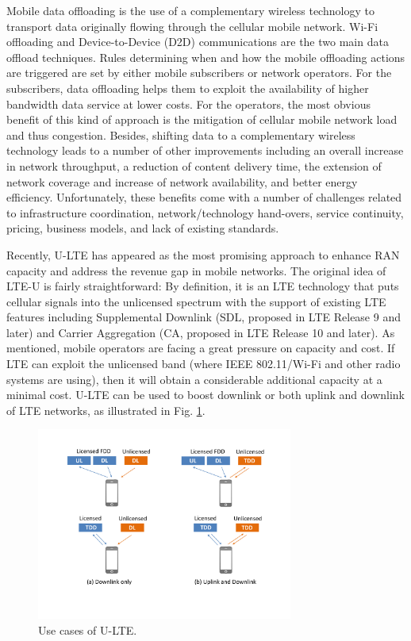 Mobile data offloading is the use of a complementary wireless technology to transport data originally flowing through the cellular mobile network. \mbox{Wi-Fi} offloading and Device-to-Device (D2D) communications are the two main data offload techniques. Rules determining when and how the mobile offloading actions are triggered are set by either mobile subscribers or network operators. For the subscribers, data offloading helps them to exploit the availability of higher bandwidth data service at lower costs. For the operators, the most obvious benefit of this kind of approach is the mitigation of cellular mobile network load and thus congestion. Besides, shifting data to a complementary wireless technology leads to a number of other improvements including an overall increase in network throughput, a reduction of content delivery time, the extension of network coverage and increase of network availability, and better energy efficiency. Unfortunately, these benefits come with a number of challenges related to infrastructure coordination, network/technology hand-overs, service continuity, pricing, business models, and lack of existing standards. 

Recently, \mbox{U-LTE} has appeared as the most promising approach to enhance RAN capacity and address the revenue gap in mobile networks. The original idea of \mbox{LTE-U} is fairly straightforward: By definition, it is an LTE technology that puts cellular signals into the unlicensed spectrum with the support of existing LTE features including Supplemental Downlink (SDL, proposed in LTE Release 9 and later) and Carrier Aggregation (CA, proposed in LTE Release 10 and later).  As mentioned, mobile operators are facing a great pressure on capacity and cost. If LTE can exploit the unlicensed band (where IEEE 802.11/\mbox{Wi-Fi} and other radio systems are using), then it will obtain a considerable additional capacity at a minimal cost. \mbox{U-LTE} can be used to boost downlink or both uplink and downlink of LTE networks, as illustrated in Fig. \ref{figs:U-LTE-use_model}.
\begin{figure}[!ht]
	\centering
	\includegraphics[width=0.75\textwidth]{figs/U-LTE-use_model}
	\caption{Use cases of U-LTE.}
	\label{figs:U-LTE-use_model}
\end{figure}

